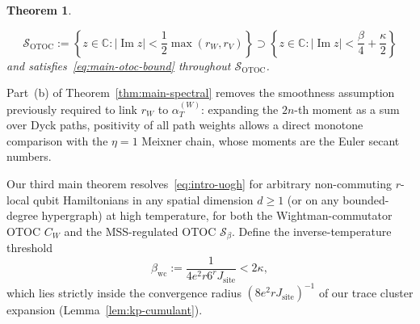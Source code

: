 \documentclass[11pt,a4paper]{article}
\numberwithin{equation}{section}
\theoremstyle{plain}
\newtheorem{theorem}{Theorem}[section]
\theoremstyle{definition}
\begin{document}
\begin{theorem}
\begin{enumerate}
  \begin{equation}\label{eq:main-strip}
    \mathcal{S}_{\mathrm{OTOC}} := \left\{z\in\mathbb{C} : |\operatorname{Im}z| < \frac{1}{2}\max(r_W,r_V)\right\} \supset \left\{z\in\mathbb{C} : |\operatorname{Im}z| < \frac{\beta}{4}+\frac{\kappa}{2}\right\}
  \end{equation}
  and satisfies~\eqref{eq:main-otoc-bound} throughout $\mathcal{S}_{\mathrm{OTOC}}$.
\end{enumerate}
\end{theorem}

Part~(b) of Theorem~\ref{thm:main-spectral} removes the smoothness assumption previously required to link $r_W$ to $\alpha_T^{(W)}$: expanding the $2n$-th moment as a sum over Dyck paths, positivity of all path weights allows a direct monotone comparison with the $\eta=1$ Meixner chain, whose moments are the Euler secant numbers.

Our third main theorem resolves~\eqref{eq:intro-uogh} for arbitrary non-commuting $r$-local qubit Hamiltonians in any spatial dimension $d\ge 1$ (or on any bounded-degree hypergraph) at high temperature, for both the Wightman-commutator OTOC $C_W$ and the MSS-regulated OTOC $\mathcal{S}_\beta$. Define the inverse-temperature threshold
\begin{equation}\label{eq:intro-betawc}
  \beta_{\mathrm{wc}} := \frac{1}{4e^2 r 6^r J_{\mathrm{site}}} < 2\kappa,
\end{equation}
which lies strictly inside the convergence radius $(8e^2 r J_{\mathrm{site}})^{-1}$ of our trace cluster expansion (Lemma~\ref{lem:kp-cumulant}).
\end{document}
